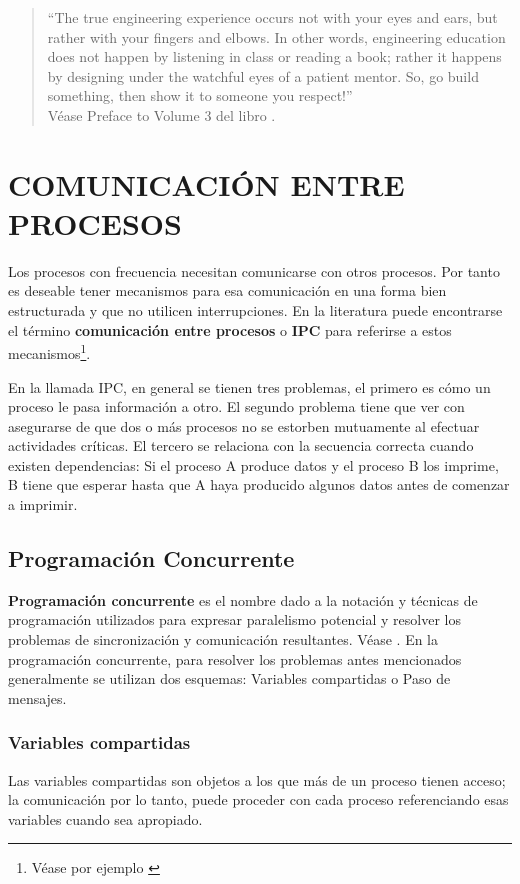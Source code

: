 \documentclass{article}
\begin{document}
\begin{quote}
``The true engineering experience occurs not with your eyes and ears, 
but rather with your fingers and elbows. In other words, engineering 
education does not happen by listening in class or reading a book; 
rather it happens by designing under the watchful eyes of a patient 
mentor. So, go build something, then show it to someone you res\-pect!''\\
V\'ease Preface to Volume 3 del libro \cite{Valvano}.
\end{quote}
\section{COMUNICACI\'ON ENTRE PROCESOS}
Los procesos con frecuencia necesitan comunicarse con otros 
procesos. Por tanto es deseable tener mecanismos para esa 
comunicaci\'on en una forma bien estructurada y que no 
utilicen interrupciones. En la literatura puede encontrarse el 
t\'ermino {\bf comunicaci\'on entre procesos} o {\bf IPC} 
para referirse a estos mecanismos\footnote{V\'ease por ejemplo
\cite{Tanenbaum}}.

En la llamada IPC, en general se tienen tres problemas, el 
primero es c\'omo un proceso le pasa informaci\'on a otro. El 
segundo problema tiene que ver con asegurarse de que dos o 
m\'as procesos no se estorben mutuamente al efectuar 
actividades cr\'iticas. El tercero se relaciona con la 
secuencia correcta cuando existen dependencias: Si el proceso 
A produce datos y el proceso B los imprime, B tiene que esperar 
hasta que A haya producido algunos datos antes de comenzar a 
imprimir.
\subsection*{Programaci\'on Concurrente}
{\bf Programaci\'on concurrente} es el nombre dado a la notaci\'on 
y t\'ecnicas de programaci\'on utilizados para expresar paralelismo 
potencial y resolver los problemas de sincronizaci\'on y 
comunicaci\'on resultantes. V\'ease \cite{Burns}. En la programaci\'on 
concurrente, para resolver los problemas antes mencionados generalmente 
se utilizan dos esquemas: Variables compartidas o Paso de mensajes.
\subsubsection*{Variables compartidas}
Las variables compartidas son objetos a los que m\'as de un 
proceso tienen acceso; la comunicaci\'on por lo tanto, puede 
proceder con cada proceso referenciando esas variables cuando 
sea apropiado.
\end{document}
